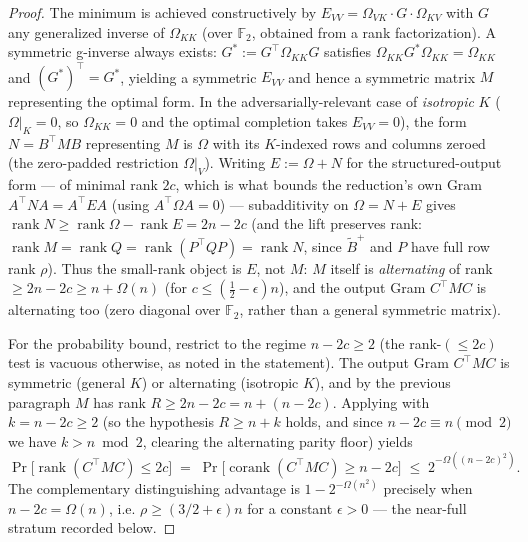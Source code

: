 \documentclass[11pt,a4paper]{article}
\theoremstyle{plain}
\theoremstyle{definition}
\newcommand{\F}{\mathbb{F}}
\begin{document}
\begin{proof}
The minimum is achieved constructively by $E_{VV} = \Omega_{VK} \cdot G \cdot \Omega_{KV}$ with $G$ any generalized inverse of $\Omega_{KK}$ (over $\F_2$, obtained from a rank factorization). A symmetric g-inverse always exists: $G^* := G^{\top} \Omega_{KK} G$ satisfies $\Omega_{KK} G^* \Omega_{KK} = \Omega_{KK}$ and $(G^*)^{\top} = G^*$, yielding a symmetric $E_{VV}$ and hence a symmetric matrix $M$ representing the optimal form. In the adversarially-relevant case of \emph{isotropic} $K$ ($\Omega|_K = 0$, so $\Omega_{KK}=0$ and the optimal completion takes $E_{VV}=0$), the form $N = B^{\top}MB$ representing $M$ is $\Omega$ with its $K$-indexed rows and columns zeroed (the zero-padded restriction $\Omega|_V$). Writing $E := \Omega + N$ for the structured-output form --- of minimal rank $2c$, which is what bounds the reduction's own Gram $A^{\top}NA = A^{\top}EA$ (using $A^{\top}\Omega A = 0$) --- subadditivity on $\Omega = N + E$ gives $\operatorname{rank} N \ge \operatorname{rank}\Omega - \operatorname{rank} E = 2n-2c$ (and the lift preserves rank: $\operatorname{rank} M = \operatorname{rank} Q = \operatorname{rank}(P^{\top}QP) = \operatorname{rank} N$, since $\tilde B^{+}$ and $P$ have full row rank $\rho$). Thus the small-rank object is $E$, not $M$: $M$ itself is \emph{alternating} of rank $\ge 2n-2c \ge n+\Omega(n)$ (for $c \le (\tfrac12-\epsilon)n$), and the output Gram $C^{\top}MC$ is alternating too (zero diagonal over $\F_2$, rather than a general symmetric matrix).

For the probability bound, restrict to the regime $n - 2c \ge 2$ (the rank-$(\le\!2c)$ test is vacuous otherwise, as noted in the statement). The output Gram $C^{\top}MC$ is symmetric (general $K$) or alternating (isotropic $K$), and by the previous paragraph $M$ has rank $R \ge 2n-2c = n + (n-2c)$. Applying  with $k = n-2c \ge 2$ (so the hypothesis $R \ge n+k$ holds, and since $n-2c \equiv n \!\!\pmod 2$ we have $k > n \bmod 2$, clearing the alternating parity floor) yields
\[
\Pr\bigl[\operatorname{rank}(C^{\top}MC) \le 2c\bigr] \;=\; \Pr\bigl[\operatorname{corank}(C^{\top}MC) \ge n-2c\bigr] \;\le\; 2^{-\Omega((n-2c)^2)}.
\]
The complementary distinguishing advantage is $1 - 2^{-\Omega(n^2)}$ precisely when $n - 2c = \Omega(n)$, i.e. $\rho \ge (3/2+\epsilon)n$ for a constant $\epsilon>0$ --- the near-full stratum recorded below.
\end{proof}
\end{document}
